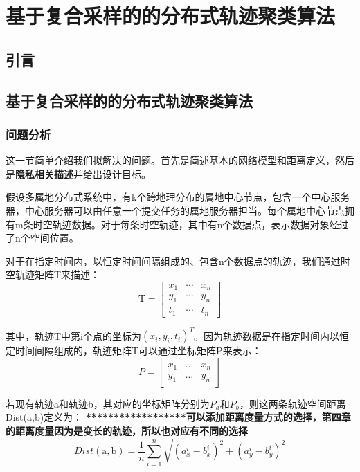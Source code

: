 \chapter{基于复合采样的的分布式轨迹聚类算法}
\section{引言}



\section{基于复合采样的的分布式轨迹聚类算法}

\subsection{问题分析}
这一节简单介绍我们拟解决的问题。首先是简述基本的网络模型和距离定义，然后是\textbf{隐私相关描述}并给出设计目标。

假设多属地分布式系统中，有k个跨地理分布的属地中心节点，包含一个中心服务器，中心服务器可以由任意一个提交任务的属地服务器担当。每个属地中心节点拥有m条时空轨迹数据。对于每条时空轨迹，其中有n个数据点，表示数据对象经过了n个空间位置。

对于在指定时间内，以恒定时间间隔组成的、包含n个数据点的轨迹，我们通过时空轨迹矩阵T来描述：
\[
\mathrm{T}=\left[\begin{array}{lll}
{x_{1}} & {\cdots} & {x_{n}} \\
{y_{1}} & {\cdots} & {y_{n}} \\
{t_{1}} & {\cdots} & {t_{n}}
\end{array}\right]
\]

其中，轨迹T中第i个点的坐标为$(x_i,y_i,t_i)^T$。因为轨迹数据是在指定时间内以恒定时间间隔组成的，轨迹矩阵T可以通过坐标矩阵P来表示：
\[
P=\left[\begin{array}{lll}
{x_{1}} & {\dots} & {x_{n}} \\
{y_{1}} & {\dots} & {y_{n}}
\end{array}\right]
\]

若现有轨迹a和轨迹b，其对应的坐标矩阵分别为$P_a$和$P_b$，则这两条轨迹空间距离Dist(a,b)定义为：
\textbf{******************可以添加距离度量方式的选择，第四章的距离度量因为是变长的轨迹，所以也对应有不同的选择}
\begin{equation}
\label{ch3dist}
Dist(\mathrm{a}, \mathrm{b})=\frac{1}{n} \sum_{i=1}^{n} \sqrt{\left(a_{x}^{i}-b_{x}^{i}\right)^{2}+\left(a_{y}^{i}-b_{y}^{i}\right)^{2}}
\end{equation}

